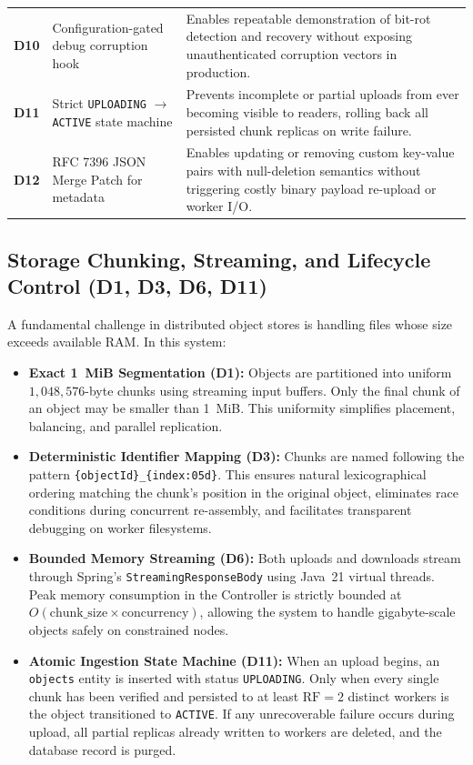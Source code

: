 \documentclass[12pt,a4paper]{report}
\begin{document}
\begin{table}[H]
\begin{tabularx}{\textwidth}{>{\bfseries}l p{4.2cm} X}
    \addlinespace
    D10 & Configuration-gated debug corruption hook & Enables repeatable demonstration of bit-rot detection and recovery without exposing unauthenticated corruption vectors in production. \\
    \addlinespace
    D11 & Strict \texttt{UPLOADING} $\rightarrow$ \texttt{ACTIVE} state machine & Prevents incomplete or partial uploads from ever becoming visible to readers, rolling back all persisted chunk replicas on write failure. \\
    \addlinespace
    D12 & RFC 7396 JSON Merge Patch for metadata & Enables updating or removing custom key-value pairs with null-deletion semantics without triggering costly binary payload re-upload or worker I/O. \\
    \bottomrule
  \end{tabularx}
\end{table}

\subsection{Storage Chunking, Streaming, and Lifecycle Control (D1, D3, D6, D11)}
A fundamental challenge in distributed object stores is handling files whose size exceeds available RAM. In this system:
\begin{itemize}[leftmargin=*]
  \item \textbf{Exact 1~MiB Segmentation (D1):} Objects are partitioned into uniform $1,048,576$-byte chunks using streaming input buffers. Only the final chunk of an object may be smaller than 1~MiB. This uniformity simplifies placement, balancing, and parallel replication.
  \item \textbf{Deterministic Identifier Mapping (D3):} Chunks are named following the pattern \texttt{\{objectId\}\_\{index:05d\}}. This ensures natural lexicographical ordering matching the chunk's position in the original object, eliminates race conditions during concurrent re-assembly, and facilitates transparent debugging on worker filesystems.
  \item \textbf{Bounded Memory Streaming (D6):} Both uploads and downloads stream through Spring's \texttt{StreamingResponseBody} using Java~21 virtual threads. Peak memory consumption in the Controller is strictly bounded at $O(\text{chunk\_size} \times \text{concurrency})$, allowing the system to handle gigabyte-scale objects safely on constrained nodes.
  \item \textbf{Atomic Ingestion State Machine (D11):} When an upload begins, an \texttt{objects} entity is inserted with status \texttt{UPLOADING}. Only when every single chunk has been verified and persisted to at least $\text{RF} = 2$ distinct workers is the object transitioned to \texttt{ACTIVE}. If any unrecoverable failure occurs during upload, all partial replicas already written to workers are deleted, and the database record is purged.
\end{itemize}
\end{document}
